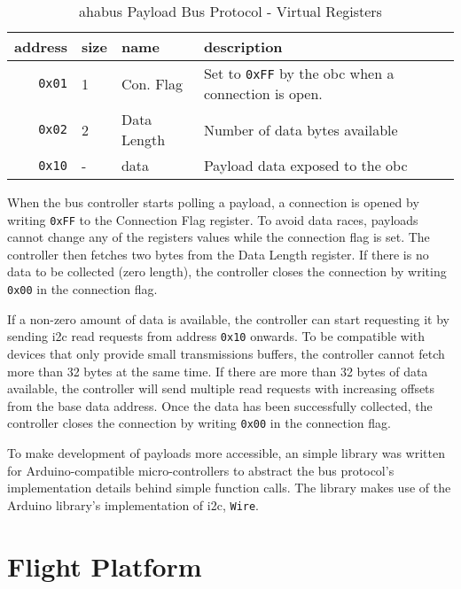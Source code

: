 \begin{table}[h]
\begin{center}
\begin{tabular}{r||l l l}

address & size & name & description \\ \hline
\texttt{0x01} & 1 & Con. Flag & Set to \texttt{0xFF} by the \acrshort{obc} when  a connection is open. \\
\texttt{0x02} & 2 & Data Length & Number of data bytes available \\
\texttt{0x10} & - & data & Payload data exposed to the \acrshort{obc}

\end{tabular}
\end{center}
\caption {\acrshort{ahabus} Payload Bus Protocol - Virtual Registers}
\label{tab:bus-protocol-registers}
\end{table}

When the bus controller starts polling a payload, a connection is opened by
writing \texttt{0xFF} to the Connection Flag register. To avoid data races,
payloads cannot change any of the registers values while the connection flag
is set. The controller then fetches two bytes from the Data Length register. If
there is no data to be collected (zero length), the controller closes the
connection by writing \texttt{0x00} in the connection flag.

If a non-zero amount of data is available, the controller can start requesting
it by sending \acrshort{i2c} read requests from address \texttt{0x10} onwards.
To be compatible with devices that only provide small transmissions buffers,
the controller cannot fetch more than 32 bytes at the same time. If there are
more than 32 bytes of data available, the controller will send multiple read
requests with increasing offsets from the base data address. Once the data has 
been successfully collected, the controller closes the connection by writing
\texttt{0x00} in the connection flag.

To make development of payloads more accessible, an simple library was written
for Arduino-compatible micro-controllers to abstract the bus protocol's
implementation details behind simple function calls. The library makes use 
of the Arduino library's implementation of \acrshort{i2c}, \texttt{Wire}.

\section{Flight Platform}
\label{sec:flight-software}

